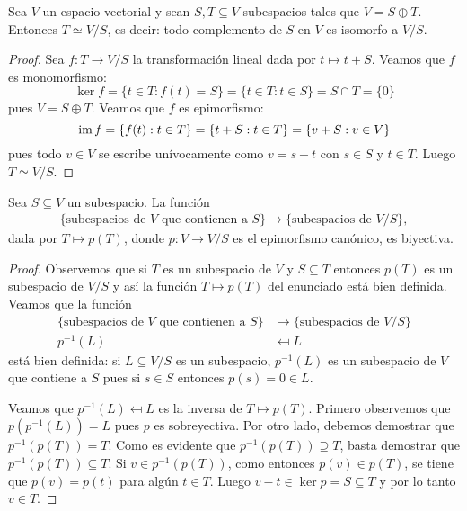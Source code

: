 \begin{cor}
    Sea $V$ un espacio vectorial y sean $S,T\subseteq V$ subespacios tales que
    $V=S\oplus T$. Entonces $T\simeq V/S$, es decir: todo complemento de $S$ en
    $V$ es isomorfo a $V/S$.

    \begin{proof}
        Sea $f\colon T\to V/S$ la transformación lineal dada por $t\mapsto
        t+S$. Veamos que $f$ es monomorfismo:
        \[
        \ker f=\{t\in T:f(t)=S\}=\{t\in T:t\in S\}=S\cap T=\{0\}
        \]
        pues $V=S\oplus T$. Veamos que $f$ es epimorfismo: 
        \[
        \operatorname{im} f=\{f(t):t\in T\}=\{t+S:t\in T\}=\{v+S:v\in V\}
        \]
        pues todo $v\in V$ se escribe unívocamente como $v=s+t$ con $s\in S$ y
        $t\in T$. Luego $T\simeq V/S$.
    \end{proof}
\end{cor}

\begin{thm}
   Sea $S\subseteq V$ un subespacio. La función
   \begin{align*}
        \{\text{subespacios de $V$ que contienen a $S$}\} \to \{\text{subespacios de $V/S$}\}, 
    \end{align*}
    dada por $T \mapsto p(T)$, donde $p\colon V\to V/S$ es el epimorfismo canónico, es biyectiva.

    \begin{proof}
		Observemos que si $T$ es un subespacio de $V$ y $S\subseteq
		T$ entonces $p(T)$ es un subespacio de $V/S$ y así la
		función $T\mapsto p(T)$ del enunciado está bien definida.  Veamos que la función
   		\begin{align*}
    	    \{\text{subespacios de $V$ que contienen a $S$}\} &\to \{\text{subespacios de $V/S$}\}\\
			p^{-1}(L) & \mapsfrom L
	    \end{align*}
		está bien definida: 
		si
		$L\subseteq V/S$ es un subespacio, $p^{-1}(L)$ es un subespacio
		de $V$ que contiene a $S$ pues si $s\in S$ entonces $p(s)=0\in L$.

		Veamos que $p^{-1}(L)\mapsfrom L$ es la inversa de $T\mapsto p(T)$.
		Primero observemos que $p(p^{-1}(L))=L$ pues $p$ es sobreyectiva.  Por
		otro lado, debemos demostrar que $p^{-1}(p(T))=T$.  Como es evidente
		que $p^{-1}(p(T))\supseteq T$, basta demostrar que
		$p^{-1}(p(T))\subseteq T$.  Si $v\in p^{-1}(p(T))$, como entonces
		$p(v)\in p(T)$, se tiene que $p(v)=p(t)$ para algún $t\in T$. Luego
		$v-t\in\ker p=S\subseteq T$ y por lo tanto $v\in T$. 
    \end{proof}
\end{thm}

